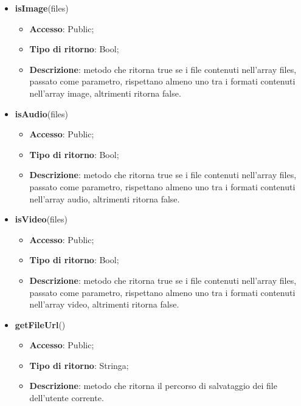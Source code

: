 {\begin{itemize}
\begin{itemize}
				\item \textbf{Tipo di ritorno}: Void;
				\item \textbf{Descrizione}: metodo che effettua l'upload dei file contenuti nell'array files passato come parametro. Se l'operazione ha successo viene invocato success altrimenti error.
			\end{itemize}
			\item \textbf{isImage}(files)
			\begin{itemize}
				\item \textbf{Accesso}: Public;
				\item \textbf{Tipo di ritorno}: Bool;
				\item \textbf{Descrizione}: metodo che ritorna true se i file contenuti nell'array files, passato come parametro, rispettano almeno uno tra i formati contenuti nell'array image, altrimenti ritorna false.
			\end{itemize}
			\item \textbf{isAudio}(files)
			\begin{itemize}
				\item \textbf{Accesso}: Public;
				\item \textbf{Tipo di ritorno}: Bool;
				\item \textbf{Descrizione}: metodo che ritorna true se i file contenuti nell'array files, passato come parametro, rispettano almeno uno tra i formati contenuti nell'array audio, altrimenti ritorna false.
			\end{itemize}
			\item \textbf{isVideo}(files)
			\begin{itemize}
				\item \textbf{Accesso}: Public;
				\item \textbf{Tipo di ritorno}: Bool;
				\item \textbf{Descrizione}: metodo che ritorna true se i file contenuti nell'array files, passato come parametro, rispettano almeno uno tra i formati contenuti nell'array video, altrimenti ritorna false.
			\end{itemize}
			\item \textbf{getFileUrl}()
			\begin{itemize}
				\item \textbf{Accesso}: Public;
				\item \textbf{Tipo di ritorno}: Stringa;
				\item \textbf{Descrizione}: metodo che ritorna il percorso di salvataggio dei file dell'utente corrente.
			\end{itemize}
		\end{itemize} 
}

